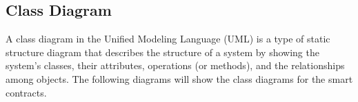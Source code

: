 
\newpage

\subsection{Class Diagram}

A class diagram in the Unified Modeling Language (UML) is a type of static structure diagram that describes the structure of a system by showing the system's classes, their attributes, operations (or methods), and the relationships among objects.
The following diagrams will show the class diagrams for the smart contracts.

